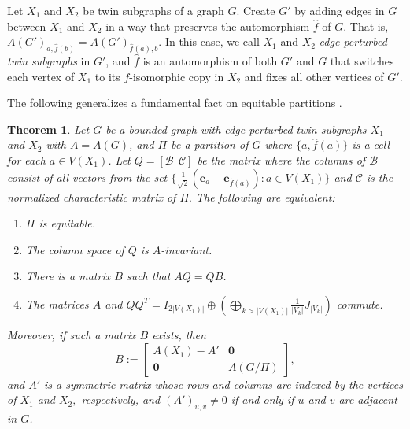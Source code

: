\documentclass[12pt,a4paper]{article}
\newtheorem{thm}{Theorem}
\def \e {{\bf e}}
\def \e {{\mathbf e}}
\begin{document}
Let $X_1$ and $X_2$ be twin subgraphs of a graph $G$. Create $G'$ by adding edges in $G$ between $X_1$ and $X_2$ in a way that preserves the automorphism $\hat{f}$ of $G$. That is, $A(G')_{a,\hat{f}(b)}=A(G')_{\hat{f}(a),b}$. In this case, we call $X_1$ and $X_2$ \textit{edge-perturbed twin subgraphs} in $G'$, and $\hat{f}$ is an automorphism of both $G'$ and $G$ that switches each vertex of $X_1$ to its $f$-isomorphic copy in $X_2$ and fixes all other vertices of $G'$.

The following generalizes a fundamental fact on equitable partitions \cite[Lemma 4.2]{god2}. 

\begin{thm}
\label{godgen}
Let $G$ be a bounded graph with edge-perturbed twin subgraphs $X_1$ and $X_2$ with $A=A(G)$, and $\Pi$ be a partition of $G$ where $\{a,\hat{f}(a)\}$ is a cell for each $a\in V (X_1)$. Let $Q=[\mathcal{B}~~\mathcal{C}]$ be the matrix where the columns of $\mathcal{B}$ consist of all vectors from the set $\{\frac{1}{\sqrt2}(\e_a-\e_{\hat{f}(a)}):a\in V(X_1)\}$ and $\mathcal{C}$ is the normalized characteristic matrix of $\Pi.$ The following are equivalent:
\begin{enumerate}
\item $\Pi$ is equitable.
\item The column space of $Q$ is $A$-invariant.
\item There is a matrix $B$ such that $AQ=QB$.
\item The matrices $A$ and $QQ^T=\displaystyle I_{2|V(X_1)|}\oplus \left(\bigoplus_{k>|V(X_1)|} \frac{1}{|V_k|}J_{|V_k|}\right)$ commute.
\end{enumerate}
Moreover, if such a matrix $B$ exists, then
\begin{equation}
\label{B}
B:=\begin{bmatrix}
     A(X_1)-A' & \mathbf{0}\\
     \mathbf{0} & A(G/\Pi)
     \end{bmatrix},
\end{equation}
and $A'$ is a symmetric matrix whose rows and columns are indexed by the vertices of $X_1$ and $X_2,$ respectively, and $(A')_{u,v}\neq 0$ if and only if $u$ and $v$ are adjacent in $G$.
\end{thm}
\end{document}
